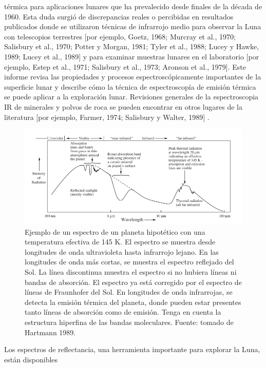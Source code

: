 \documentclass[12pt]{article}
\begin{document}
térmica para aplicaciones lunares que ha prevalecido desde finales de la década de 1960. Esta duda 
surgió de discrepancias reales o percibidas en resultados publicados donde se utilizaron técnicas de 
infrarrojo medio para observar la Luna con telescopios terrestres [por ejemplo, Goetz, 1968; Murcray 
et al., 1970; Salisbury et al., 1970; Potter y Morgan, 1981; Tyler et al., 1988; Lucey y Hawke, 1989; 
Lucey et al., 1989] y para examinar muestras lunares en el laboratorio [por ejemplo, Estep et al., 
1971; Salisbury et al., 1973; Aronson et al., 1979]. Este informe revisa las propiedades y 
procesos espectroscópicamente importantes de la superficie lunar y describe cómo la técnica 
de espectroscopía de emisión térmica se puede aplicar a la exploración lunar. Revisiones generales 
de la espectroscopia IR de minerales y polvos de roca se pueden encontrar en otros lugares de la 
literatura [por ejemplo, Farmer, 1974; Salisbury y Walter, 1989] \parencite{NAsh_douglas}.
\begin{figure}[H]
    \centering
    \includegraphics[width=1\textwidth]{images/Emision_moon_example.png}
    \caption{Ejemplo de un espectro de un planeta hipotético con una temperatura efectiva de 145 K. 
    El espectro se muestra desde longitudes de onda ultravioleta hasta infrarrojo lejano. 
    En las longitudes de onda más cortas, se muestra el espectro reflejado del Sol. La línea 
    discontinua muestra el espectro si no hubiera líneas ni bandas de absorción. El espectro ya 
    está corregido por el espectro de líneas de Fraunhofer del Sol. En longitudes de onda infrarrojas, 
    se detecta la emisión térmica del planeta, donde pueden estar presentes tanto líneas de absorción 
    como de emisión. Tenga en cuenta la estructura hiperfina de las bandas moleculares.
    Fuente: tomado de Hartmann 1989.}
    \label{fig:ejemplo_emision_luna}
\end{figure}
Los espectros de reflectancia, una herramienta importante para explorar la Luna, están disponibles 
\end{document}
